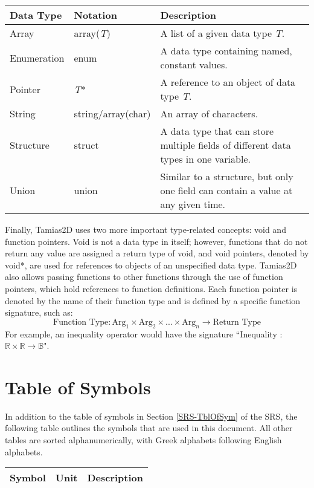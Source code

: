 \documentclass[12pt]{article}
\newcommand{\inquote}[1]{``{#1}"}
\newcommand{\progname}{Tamias2D }
\begin{document}
\renewcommand*{\arraystretch}{1.2}
\noindent \begin{longtable}{l l p{9.5cm}}
\toprule
	\textbf{Data Type} & \textbf{Notation} & \textbf{Description} \\
\midrule
	Array & array(\textit{T}) & A list of a given data type \textit{T}. \\
	Enumeration & enum & A data type containing named, constant values. \\
	Pointer & \textit{T}* & A reference to an object of data type \textit{T}. \\
	String & string/array(char) & An array of characters. \\
	Structure & struct & A data type that can store multiple fields of different data types in one variable. \\
	Union & union & Similar to a structure, but only one field can contain a value at any given time. \\
	\bottomrule
\end{longtable}

\noindent Finally, \progname uses two more important type-related concepts: void and function pointers. Void is not a data type in itself; however, functions that do not return any value are assigned a return type of void, and void pointers, denoted by void*, are used for references to objects of an unspecified data type. \progname also allows passing functions to other functions through the use of function pointers, which hold references to function definitions. Each function pointer is denoted by the name of their function type and is defined by a specific function signature, such as: 
$$\text{Function Type} : \text{Arg}_1 \times \text{Arg}_2 \times ... \times \text{Arg}_n \to \text{Return Type}$$
For example, an inequality operator would have the signature \inquote{Inequality : $\mathbb{R} \times \mathbb{R} \to \mathbb{B}$}.

\iffalse

\section{Table of Symbols}

In addition to the table of symbols in Section 
\ref{SRS-TblOfSym} of the SRS, the following table outlines the 
symbols that are used in this document. All other tables are sorted alphanumerically, with Greek alphabets following English alphabets. 

\renewcommand*{\arraystretch}{1.2}
\noindent 
\begin{longtable}{l l p{12cm}} 
\toprule 
\textbf{Symbol} & \textbf{Unit} & \textbf{Description}\\ \midrule
\bottomrule 
\end{longtable} 
\end{document}
